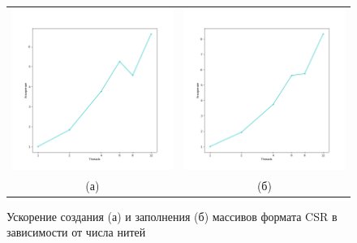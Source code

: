\documentclass[12pt, a4paper]{article}
\begin{document}
\begin{figure}[H]
	\center
	\begin{tabular}{cc}
		\includegraphics[width=85mm]{csr_init_speedup} & \includegraphics[width=85mm]{csr_fill_speedup} \\
		(а) & (б) \\[6pt]
	\end{tabular}
	\caption{Ускорение создания (а) и заполнения (б) массивов формата CSR в зависимости от числа нитей} 
	\label{fig:gridd}
\end{figure}
\end{document}
